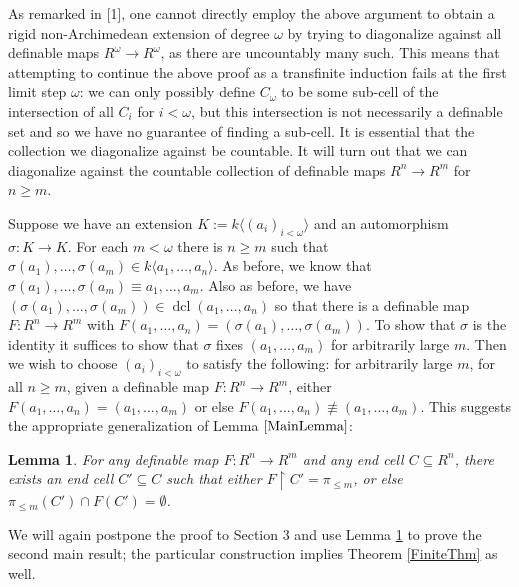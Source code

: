 \documentclass{article}
\DeclareMathOperator{\dcl}{dcl}
\newtheorem{lemma}[theorem]{Lemma}
\theoremstyle{remark}
\theoremstyle{definition}
\theoremstyle{definition}
\theoremstyle{definition}
\theoremstyle{definition}
\begin{document}
As remarked in [1], one cannot directly employ the above argument to obtain a rigid non-Archimedean extension of degree $\omega$ by trying to diagonalize against all definable maps $R^\omega\to R^\omega$, as there are uncountably many such. This means that attempting to continue the above proof as a transfinite induction fails at the first limit step $\omega$: we can only possibly define $C_\omega$ to be some sub-cell of the intersection of all $C_i$ for $i<\omega$, but this intersection is not necessarily a definable set and so we have no guarantee of finding a sub-cell. It is essential that the collection we diagonalize against be countable. It will turn out that we can diagonalize against the countable collection of definable maps $R^n\to R^m$ for $n\geq m$.

Suppose we have an extension $K:=k\langle (a_i)_{i<\omega}\rangle$ and an automorphism $\sigma: K\to K$. For each $m<\omega$ there is $n\geq m$ such that $\sigma(a_1),\dots,\sigma(a_m)\in k\langle a_1,\dots,a_n\rangle$. As before, we know that $\sigma(a_1),\dots,\sigma(a_m)\equiv a_1,\dots,a_m$. Also as before, we have $(\sigma(a_1),\dots,\sigma(a_m))\in\dcl(a_1,\dots,a_n)$ so that there is a definable map $F:R^n\to R^m$ with $F(a_1,\dots,a_n)=(\sigma(a_1),\dots,\sigma(a_m))$. To show that $\sigma$ is the identity it suffices to show that $\sigma$ fixes $(a_1,\dots,a_m)$ for arbitrarily large $m$. Then we wish to choose $(a_i)_{i<\omega}$ to satisfy the following: for arbitrarily large $m$, for all $n\geq m$, given a definable map $F:R^n\to R^m$, either $F(a_1,\dots,a_n)=(a_1,\dots,a_m)$ or else $F(a_1,\dots,a_n)\not\equiv (a_1,\dots,a_m)$. This suggests the appropriate generalization of Lemma $\ref{MainLemma}$:

\begin{lemma}\label{ProjLemma}
    For any definable map $F:R^n\to R^m$ and any end cell $C\subseteq R^n$, there exists an end cell $C'\subseteq C$ such that either $F\upharpoonright C'=\pi_{\leq m}$, or else $\pi_{\leq m}(C')\cap F(C')=\emptyset$.
\end{lemma}

We will again postpone the proof to Section 3 and use Lemma \ref{ProjLemma} to prove the second main result; the particular construction implies Theorem \ref{FiniteThm} as well.
\end{document}
